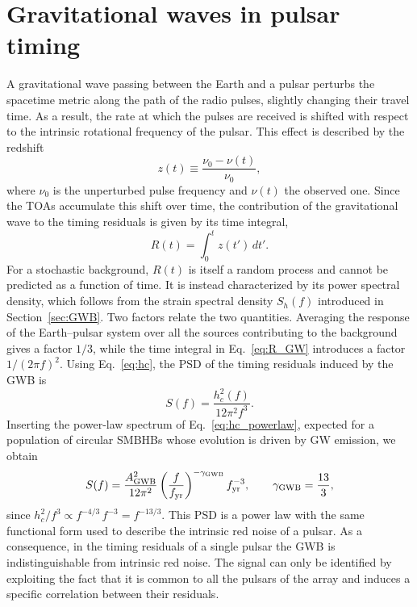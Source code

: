 \section{Gravitational waves in pulsar timing} \label{sec:timingGW}

A gravitational wave passing between the Earth and a pulsar perturbs the
spacetime metric along the path of the radio pulses, slightly changing their
travel time. As a result, the rate at which the pulses are received is shifted
with respect to the intrinsic rotational frequency of the pulsar. This effect is
described by the redshift~\cite{Detweiler1979, Maggiore2018, Taylor2021}
\begin{equation}
    z(t) \equiv \frac{\nu_0 - \nu(t)}{\nu_0},
    \label{eq:redshift}
\end{equation}
where $\nu_0$ is the unperturbed pulse frequency and $\nu(t)$ the observed one.
Since the TOAs accumulate this shift over time, the contribution of the
gravitational wave to the timing residuals is given by its time integral,
\begin{equation}
    R(t) = \int_0^t z(t')\,dt'.
    \label{eq:R_GW}
\end{equation}
For a stochastic background, $R(t)$ is itself a random process and cannot be
predicted as a function of time. It is instead characterized by its power
spectral density, which follows from the strain spectral density $S_h(f)$
introduced in Section~\ref{sec:GWB}. Two factors relate the two quantities.
Averaging the response of the Earth--pulsar system over all the sources
contributing to the background gives a factor $1/3$, while the time integral in
Eq.~\eqref{eq:R_GW} introduces a factor $1/(2\pi f)^2$. Using
Eq.~\eqref{eq:hc}, the PSD of the timing residuals induced by the GWB is~\cite{Taylor2021}
\begin{equation}
    S(f) = \frac{h_c^2(f)}{12\pi^2 f^3}.
    \label{eq:PSD_hc}
\end{equation}
Inserting the power-law spectrum of Eq.~\eqref{eq:hc_powerlaw}, expected for a
population of circular SMBHBs whose evolution is driven by GW emission, we obtain
\begin{equation}
    S(f) = \frac{A_{\mathrm{GWB}}^2}{12\pi^2}\left(\frac{f}{f_{\mathrm{yr}}}\right)^{-\gamma_{\mathrm{GWB}}}f_{\mathrm{yr}}^{-3},
    \qquad \gamma_{\mathrm{GWB}} = \frac{13}{3},
    \label{eq:PSD_GWB}
\end{equation}
since $h_c^2/f^3 \propto f^{-4/3}\,f^{-3} = f^{-13/3}$.
This PSD is a power law with the same functional form used to describe the
intrinsic red noise of a pulsar. As a consequence, in the timing residuals of a
single pulsar the GWB is indistinguishable from intrinsic red noise. The signal
can only be identified by exploiting the fact that it is common to all the
pulsars of the array and induces a specific correlation between their residuals.

